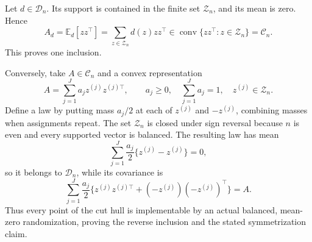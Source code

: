 Let \(d\in\mathcal D_n\).  Its support is contained in the finite set \(\mathcal Z_n\), and its mean is zero.  Hence
\[
A_d=\mathbb E_d[zz^\top]
=\sum_{z\in\mathcal Z_n}d(z)zz^\top
\in\operatorname{conv}\{zz^\top:z\in\mathcal Z_n\}=\mathcal C_n.
\]
This proves one inclusion.

Conversely, take \(A\in\mathcal C_n\) and a convex representation
\[
A=\sum_{j=1}^J a_j z^{(j)}z^{(j)\top},
\qquad a_j\geq0,\quad \sum_{j=1}^J a_j=1,
\quad z^{(j)}\in\mathcal Z_n.
\]
Define a law by putting mass \(a_j/2\) at each of \(z^{(j)}\) and \(-z^{(j)}\), combining masses when assignments repeat.  The set \(\mathcal Z_n\) is closed under sign reversal because \(n\) is even and every supported vector is balanced.  The resulting law has mean
\[
\sum_{j=1}^J\frac{a_j}{2}\{z^{(j)}-z^{(j)}\}=0,
\]
so it belongs to \(\mathcal D_n\), while its covariance is
\[
\sum_{j=1}^J\frac{a_j}{2}
\{z^{(j)}z^{(j)\top}+(-z^{(j)})(-z^{(j)})^\top\}=A.
\]
Thus every point of the cut hull is implementable by an actual balanced, mean-zero randomization, proving the reverse inclusion and the stated symmetrization claim.